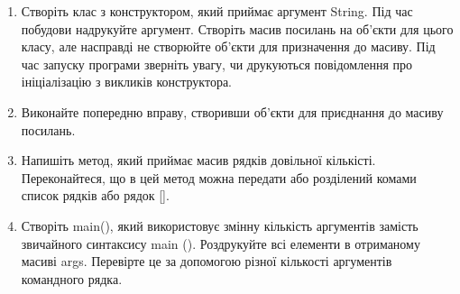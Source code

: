 \documentclass[]{article}
\begin{document}
\begin{enumerate}
\item
 Створіть клас з конструктором, який приймає аргумент String. Під час побудови надрукуйте аргумент. Створіть масив посилань на об’єкти для цього класу, але насправді не створюйте об’єкти для призначення до масиву. Під час запуску програми зверніть увагу, чи друкуються повідомлення про ініціалізацію з викликів конструктора.
\item
 Виконайте попередню вправу, створивши об’єкти для приєднання до масиву посилань.
\item
 Напишіть метод, який приймає масив рядків довільної кількісті. Переконайтеся, що в цей метод можна передати або розділений комами список рядків або рядок [].
\item
 Створіть main(), який використовує змінну кількість аргументів замість звичайного синтаксису main (). Роздрукуйте всі елементи в отриманому масиві args. Перевірте це за допомогою різної кількості аргументів командного рядка.


\end{enumerate}
\end{document}

